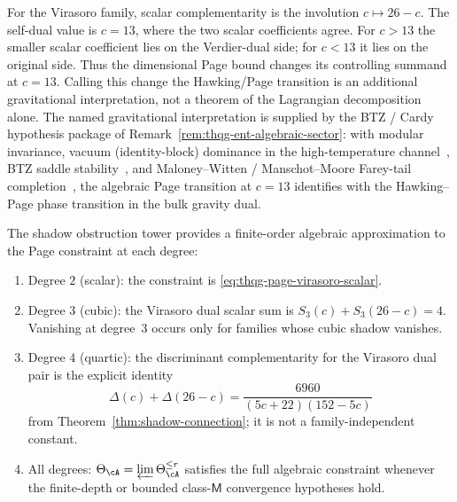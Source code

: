\begin{remark}
\label{rem:thqg-page-transition}
For the Virasoro family, scalar complementarity is the involution
$c\mapsto 26-c$.  The self-dual value is $c=13$, where the two scalar
coefficients agree.  For $c>13$ the smaller scalar coefficient lies on
the Verdier-dual side; for $c<13$ it lies on the original side.  Thus
the dimensional Page bound changes its controlling summand at
$c=13$.  Calling this change the Hawking/Page transition is an
additional gravitational interpretation, not a theorem of the
Lagrangian decomposition alone. The named gravitational interpretation
is supplied by the BTZ / Cardy hypothesis package of
Remark~\ref{rem:thqg-ent-algebraic-sector}: with modular invariance,
vacuum (identity-block) dominance in the high-temperature
channel~\cite{Cardy86}, BTZ saddle stability~\cite{BTZ92}, and
Maloney--Witten / Manschot--Moore Farey-tail
completion~\cite{Maloney-Witten07}, the algebraic Page transition at
$c=13$ identifies
with the Hawking--Page phase transition in the bulk gravity dual.
\end{remark}

\begin{remark}
\label{rem:thqg-page-constructive}
The shadow obstruction tower provides a finite-order algebraic
approximation to the Page constraint at each degree:
\begin{enumerate}[label=\textup{(\arabic*)}]
\item Degree $2$ (scalar): the constraint is
 \eqref{eq:thqg-page-virasoro-scalar}.
\item Degree $3$ (cubic): the Virasoro dual scalar sum is
 $S_3(c)+S_3(26-c)=4$.  Vanishing at degree~$3$ occurs only for
 families whose cubic shadow vanishes.
\item Degree $4$ (quartic): the discriminant complementarity
 for the Virasoro dual pair is the explicit identity
 \[
 \Delta(c)+\Delta(26-c)
 =
 \frac{6960}{(5c+22)(152-5c)}
 \]
 from Theorem~\ref{thm:shadow-connection}; it is not a
 family-independent constant.
\item All degrees: $\Theta_\cA = \varprojlim \Theta_\cA^{\le r}$
 satisfies the full algebraic constraint whenever the finite-depth or
 bounded class-$\mathsf M$ convergence hypotheses hold.
\end{enumerate}
\end{remark}

